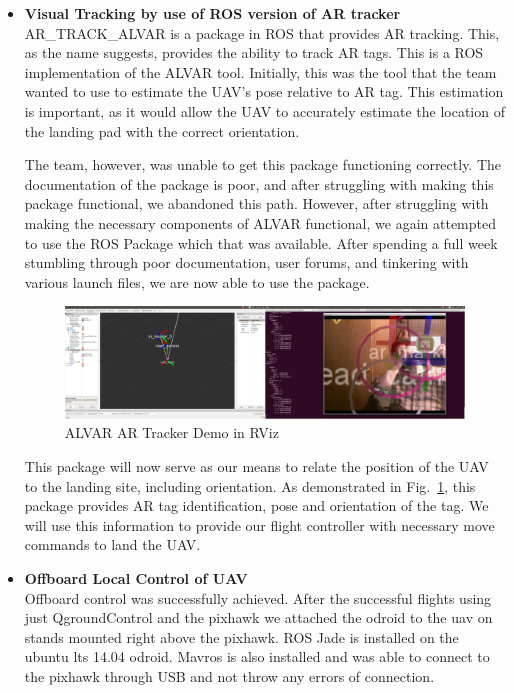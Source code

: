 \begin{itemize}
\begin{itemize}
\item \textbf{Visual Tracking by use of ROS version of AR tracker}\\
AR\_TRACK\_ALVAR is a package in ROS that provides AR tracking. This, as the name suggests, provides the ability to track AR tags. This is a ROS implementation of the ALVAR tool. Initially, this was the tool that the team wanted to use to estimate the UAV's pose relative to AR tag. This estimation is important, as it would allow the UAV to accurately estimate the location of the landing pad with the correct orientation. \par
The team, however, was unable to get this package functioning correctly. The documentation of the package is poor, and after struggling with making this package functional, we abandoned this path. However, after struggling with making the necessary components of ALVAR functional, we again attempted to use the ROS Package which that was available. After spending a full week stumbling through poor documentation, user forums, and tinkering with various launch files, we are now able to use the package.\par
\begin{figure}[h]
\includegraphics[width=7in]{images/artrackdemo.png}
\centering
\caption{ALVAR AR Tracker Demo in RViz}
\label{fig:artracker}
\end{figure}
This package will now serve as our means to relate the position of the UAV to the landing site, including orientation. As demonstrated in Fig.~\ref{fig:artracker}, this package provides AR tag identification, pose and orientation of the tag. We will use this information to provide our flight controller with necessary move commands to land the UAV.\par

\item \textbf{Offboard Local Control of UAV}\\
Offboard control was successfully achieved. After the successful flights using just QgroundControl and the pixhawk we attached the odroid to the uav on stands mounted right above the pixhawk. ROS Jade is installed on the ubuntu lts 14.04 odroid. Mavros is also installed and was able to connect to the pixhawk through USB and not throw any errors of connection.\par


\end{itemize}
\end{itemize}
